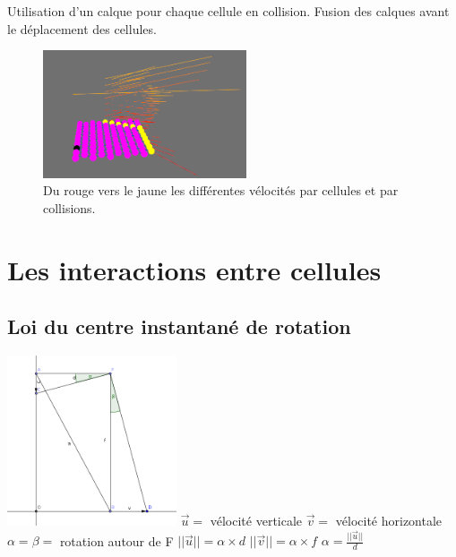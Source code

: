 \documentclass{beamer}
\begin{document}
\begin{frame}
  Utilisation d'un calque pour chaque cellule en collision. Fusion des calques avant le déplacement des cellules.
  \begin{figure}
    \begin{center}
      \includegraphics[width=6cm]{Images/layer.png}
    \end{center}
    \caption{Du rouge vers le jaune les différentes vélocités par cellules et par collisions.}
  \end{figure}
\end{frame}


\section{Les interactions entre cellules}
\subsection{Loi du centre instantané de rotation}
\begin{frame}
  \begin{multicols}{2}
    \includegraphics[width=5cm]{Images/geogebra_1.png}
    \vfill
    \columnbreak
    $\overrightarrow{u} = $ vélocité verticale \smallbreak
    $\overrightarrow{v} = $ vélocité horizontale \smallbreak
    $\alpha = \beta = $ rotation autour de F \smallbreak
    $||\overrightarrow{u}|| = \alpha \times d$ \smallbreak
    $||\overrightarrow{v}|| = \alpha \times f$ \smallbreak
    $\alpha = \frac{||\overrightarrow{u}||}{d}$ \smallbreak
  \end{multicols}
\end{frame}
\end{document}
